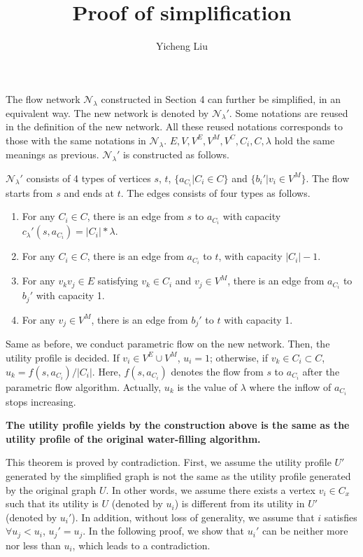 \documentclass[10pt,a4paper]{article}
\author{Yicheng Liu}
\title{Proof of simplification}
\begin{document}
The flow network $\mathcal{N_\lambda}$ constructed in Section 4 can further be simplified, in an equivalent way. The new network is denoted by $\mathcal{N_\lambda'}$. Some notations are reused in the definition of the new network. All these reused notations corresponds to those with the same notations in $\mathcal{N_\lambda}$. $E,V,V^E,V^M,V^C,C_i,C,\lambda$ hold the same meanings as previous. $\mathcal{N_\lambda'}$ is constructed as follows.

$\mathcal{N_\lambda'}$ consists of 4 types of vertices $s$, $t$, $\{a_{C_i}|C_i\in C\}$ and $\{b_i'|v_i\in V^M\}$. The flow starts from $s$ and ends at $t$. The edges consists of four types as follows.
\begin{enumerate}
	\item For any $C_i\in C$, there is an edge from $s$ to $a_{C_i}$ with capacity $c_\lambda'(s,a_{C_i})=|C_i|*\lambda$.
	\item For any $C_i\in C$, there is an edge from $a_{C_i}$ to $t$, with capacity $|C_i|-1$.
	\item For any $v_kv_j\in E$ satisfying $v_k\in C_i$ and $v_j\in V^M$, there is an edge from $a_{C_i}$ to $b_j'$ with capacity 1.
	\item For any $v_j\in V^M$, there is an edge from $b_j'$ to $t$ with capacity 1.
\end{enumerate}

Same as before, we conduct parametric flow on the new network. Then, the utility profile is decided. If $v_i\in V^E\cup V^M$, $u_i=1$; otherwise, if $v_k\in C_i \subset C$, $u_k=f(s,a_{C_i})/|C_i|$. Here, $f(s,a_{C_i})$ denotes the flow from $s$ to $a_{C_i}$ after the parametric flow algorithm. Actually,  $u_k$ is the value of $\lambda$ where the inflow of $a_{C_i}$ stops increasing. 


\textbf{	The utility profile yields by the construction above is the same as the utility profile of the original water-filling algorithm.}


This theorem is proved by contradiction. First, we assume the utility profile $U'$ generated by the simplified graph is not the same as the utility profile generated by the original graph $U$. In other words, we assume there exists a vertex $v_i\in C_x$ such that its utility is $U$ (denoted by $u_i$) is different from its utility in $U'$ (denoted by $u_i'$). In addition, without loss of generality, we assume that $i$ satisfies $\forall u_j<u_i$, $u_j'=u_j$. In the following proof, we show that $u_i'$ can be neither more nor less than $u_i$, which leads to a contradiction.
\end{document}

